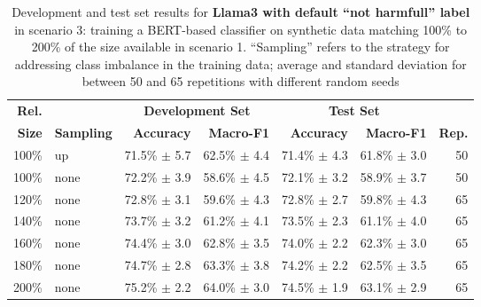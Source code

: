 
\begin{table*}[ht]
\centering
\begin{tabular}{rlrrrrr}
\textbf{Rel.}  &  &
\multicolumn{2}{c}{\textbf{Development Set}} &
\multicolumn{2}{c}{\textbf{Test Set}} \\
\textbf{Size}  & \textbf{Sampling}  &
\textbf{Accuracy} & \textbf{Macro-F1}  &
\textbf{Accuracy} & \textbf{Macro-F1}  &
\textbf{Rep.}  \\
\hline
100\%  & up  &   71.5\% $\pm$    5.7  &   62.5\% $\pm$    4.4  &   71.4\% $\pm$    4.3  &   61.8\% $\pm$    3.0  & 50  \\
\hline
100\%  & none  &   72.2\% $\pm$    3.9  &   58.6\% $\pm$    4.5  &   72.1\% $\pm$    3.2  &   58.9\% $\pm$    3.7  & 50  \\
120\%  & none  &   72.8\% $\pm$    3.1  &   59.6\% $\pm$    4.3  &   72.8\% $\pm$    2.7  &   59.8\% $\pm$    4.3  & 65  \\
140\%  & none  &   73.7\% $\pm$    3.2  &   61.2\% $\pm$    4.1  &   73.5\% $\pm$    2.3  &   61.1\% $\pm$    4.0  & 65  \\
160\%  & none  &   74.4\% $\pm$    3.0  &   62.8\% $\pm$    3.5  &   74.0\% $\pm$    2.2  &   62.3\% $\pm$    3.0  & 65  \\
180\%  & none  &   74.7\% $\pm$    2.8  &   63.3\% $\pm$    3.8  &   74.2\% $\pm$    2.2  &   62.5\% $\pm$    3.5  & 65  \\
200\%  & none  &   75.2\% $\pm$    2.2  &   64.0\% $\pm$    3.0  &   74.5\% $\pm$    1.9  &   63.1\% $\pm$    2.9  & 65  \\
\hline
\end{tabular}
\caption{Development and test set results for \textbf{Llama3 with default ``not harmfull'' label} in scenario 3:
    training a BERT-based classifier on synthetic data matching
    100\% to 200\% of the size available in scenario 1.
    ``Sampling'' refers to the strategy for addressing class
    imbalance in the training data; average and standard deviation for between 50 and 65 repetitions with different random seeds}
\label{t:results-s4-r1v1}
\end{table*}

